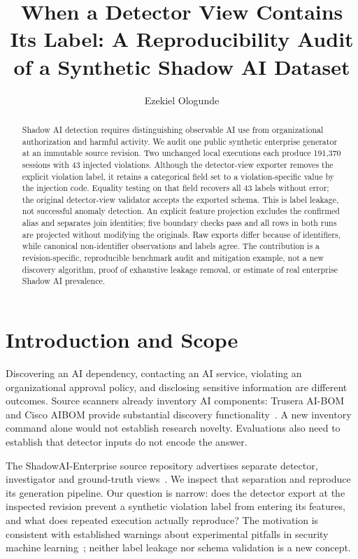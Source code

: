 \documentclass[sigconf,nonacm]{acmart}
\title{When a Detector View Contains Its Label: A Reproducibility Audit of a Synthetic Shadow AI Dataset}
\author{Ezekiel Ologunde}
\begin{document}
\begin{abstract}
Shadow AI detection requires distinguishing observable AI use from organizational authorization and harmful activity. We audit one public synthetic enterprise generator at an immutable source revision. Two unchanged local executions each produce 191,370 sessions with 43 injected violations. Although the detector-view exporter removes the explicit violation label, it retains a categorical field set to a violation-specific value by the injection code. Equality testing on that field recovers all 43 labels without error; the original detector-view validator accepts the exported schema. This is label leakage, not successful anomaly detection. An explicit feature projection excludes the confirmed alias and separates join identities; five boundary checks pass and all rows in both runs are projected without modifying the originals. Raw exports differ because of identifiers, while canonical non-identifier observations and labels agree. The contribution is a revision-specific, reproducible benchmark audit and mitigation example, not a new discovery algorithm, proof of exhaustive leakage removal, or estimate of real enterprise Shadow AI prevalence.
\end{abstract}
\maketitle

\section{Introduction and Scope}
Discovering an AI dependency, contacting an AI service, violating an organizational approval policy, and disclosing sensitive information are different outcomes. Source scanners already inventory AI components: Trusera AI-BOM and Cisco AIBOM provide substantial discovery functionality~\cite{trusera,cisco}. A new inventory command alone would not establish research novelty. Evaluations also need to establish that detector inputs do not encode the answer.

The ShadowAI-Enterprise source repository advertises separate detector, investigator and ground-truth views~\cite{dataset}. We inspect that separation and reproduce its generation pipeline. Our question is narrow: does the detector export at the inspected revision prevent a synthetic violation label from entering its features, and what does repeated execution actually reproduce? The motivation is consistent with established warnings about experimental pitfalls in security machine learning~\cite{arp}; neither label leakage nor schema validation is a new concept.
\end{document}

